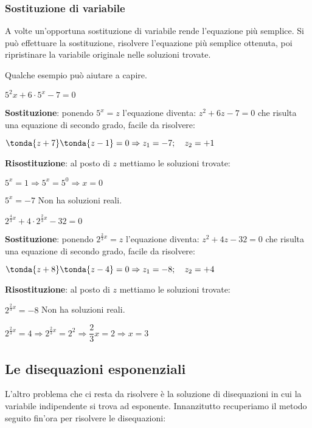 \subsubsection{Sostituzione di variabile}
\label{subsubsec:esplog_sostituzione}

A volte un'opportuna sostituzione di variabile rende l'equazione più semplice. 
Si può effettuare la sostituzione, risolvere l'equazione più semplice ottenuta, 
poi ripristinare la variabile originale nelle soluzioni trovate. 

Qualche esempio può aiutare a capire.

\begin{esempio} 
\(5^2x +6 \cdot 5^x -7=0\) 

\textbf{Sostituzione}:
ponendo \(5^x=z\) l'equazione diventa: \(z^2 +6z -7=0\) 
che risulta una equazione di secondo grado, facile da risolvere:

\(\tonda{z+7}\tonda{z-1}=0 \Rightarrow z_1=-7; \quad z_2=+1\) 

\textbf{Risostituzione}: al posto di \(z\) mettiamo le soluzioni trovate:

\(5^x=1 \Rightarrow 5^x=5^0 \Rightarrow x=0\)

\(5^x=-7\) Non ha soluzioni reali.
\end{esempio}

\begin{esempio} 
\(2^{\frac{4}{3}x} +4 \cdot 2^{\frac{2}{3}x} -32=0\) 

\textbf{Sostituzione}:
ponendo \(2^{\frac{2}{3}x}=z\) l'equazione diventa: \(z^2 +4z -32=0\) 
che risulta una equazione di secondo grado, facile da risolvere:

\(\tonda{z+8}\tonda{z-4}=0 \Rightarrow z_1=-8; \quad z_2=+4\) 

\textbf{Risostituzione}: al posto di \(z\) mettiamo le soluzioni trovate:

\(2^{\frac{2}{3}x}=-8\) Non ha soluzioni reali.

\(2^{\frac{2}{3}x}=4 \Rightarrow 2^{\frac{2}{3}x}=2^2
\Rightarrow \dfrac{2}{3}x=2 \Rightarrow x=3\)
\end{esempio}

\subsection{Le disequazioni esponenziali}
\label{subsubsec:esplog_disequazioniesponenziali}

L'altro problema che ci resta da risolvere è la soluzione di disequazioni in 
cui la variabile indipendente si trova ad esponente. Innanzitutto recuperiamo 
il metodo seguito fin'ora per risolvere le disequazioni:


